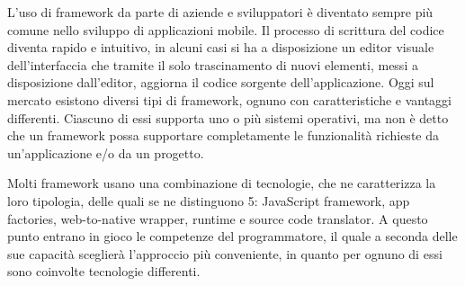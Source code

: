 L'uso di framework da parte di aziende e sviluppatori è diventato sempre più comune nello sviluppo di applicazioni mobile. Il processo di scrittura del codice diventa rapido e intuitivo, in alcuni casi si ha a disposizione un editor visuale dell'interfaccia che tramite il solo trascinamento di nuovi elementi, messi a disposizione dall'editor, aggiorna il codice sorgente dell'applicazione.
Oggi sul mercato esistono diversi tipi di framework, ognuno con caratteristiche e vantaggi differenti. Ciascuno di essi supporta uno o più sistemi operativi, ma non è detto che un framework possa supportare completamente le funzionalità richieste da un'applicazione e/o da un progetto.

Molti framework usano una combinazione di tecnologie, che ne caratterizza la loro tipologia, delle quali se ne distinguono 5: JavaScript framework, app factories, web-to-native wrapper, runtime e source code translator. A questo punto entrano in gioco le competenze del programmatore, il quale a seconda delle sue capacità sceglierà l'approccio più conveniente, in quanto per ognuno di essi sono coinvolte tecnologie differenti.
\cite{web:vision_mobile}

